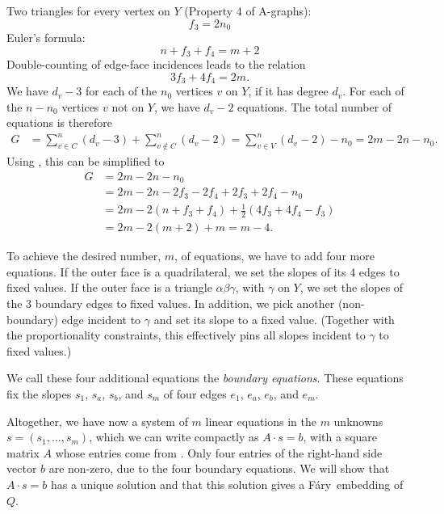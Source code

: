 \documentclass{patmorin}
\newcommand{\Fary}{Fáry}
\begin{document}
Two triangles for every vertex on $Y$ (Property 4 of A-graphs):
\begin{equation}
  \label{eq:f3}
  f_3 = 2n_0
\end{equation}
Euler's formula:
\begin{equation}
  \label{eq:Euler}
  n + f_3+f_4 = m+2
\end{equation}
Double-counting of edge-face incidences leads to the relation
\begin{equation}
  \label{eq:edge-face}
  3f_3+4f_4=2m.
\end{equation}
We have $d_v-3$ for each of the $n_0$ vertices $v$ on $Y$, if it has
degree $d_v$. For each of the 
 $n-n_0$ vertices $v$ not on $Y$, 
we have $d_v-2$ equations.
  The total number of equations is therefore
  \begin{align*}
G &= 
\sum_{v\in C}^n(d_v-3)+
\sum_{v\notin C}^n(d_v-2)
=
\sum_{v\in V}^n(d_v-2)-n_0
=
2m-2n-n_0.
  \end{align*}
Using \thetag{\ref{eq:f3}--\ref{eq:edge-face}}, this can be
simplified to
\begin{align*}
G&=
2m-2n-n_0\\
&= 2m -2n -2f_3-2f_4 +2f_3+2f_4-n_0\\
&= 2m -2(n +f_3+f_4) +\tfrac12(4f_3+4f_4-f_3)\\
&= 2m -2(m+2) +m = m-4.
\end{align*}

To achieve the desired number, $m$, of equations, we have to add four
more equations.
If the outer face is a quadrilateral, we set the slopes of its
 4 edges
to fixed values.
If the outer face is a triangle $\alpha\beta\gamma$, with $\gamma$ on
$Y$, we set the slopes of the 3 boundary edges
to fixed values. In addition, we pick another (non-boundary) edge
incident to $\gamma$ and set its slope to a fixed value.
(Together with the proportionality constraints, this effectively pins
all slopes
incident to $\gamma$ to fixed values.)

We call these four additional equations the \emph{boundary equations}.
These equations fix the slopes $s_1$, $s_a$, $s_b$, and $s_m$ of four
edges $e_1$, $e_a$, $e_b$, and $e_m$.

Altogether, we have now a system of $m$ linear equations
in the $m$ unknowns $s=(s_1,\ldots,s_m)$, which we can write
compactly as
 $A\cdot s = b$, with a square matrix $A$ whose entries come from
 \thetag{\ref{eq:slope0}--\ref{eq:proportion2}}.
Only four entries of
the right-hand side vector
 $b$
are non-zero, due to the four boundary equations.
We will show that $A\cdot s=b$ has a unique
solution and that this solution gives a \Fary\ embedding of $Q$.
\end{document}
